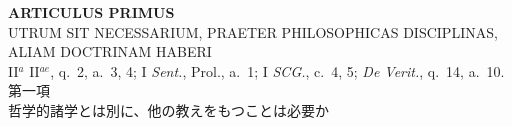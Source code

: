 \documentclass[
paper=a4paper,
fontsize=10pt,
jafontsize=9pt,
titlepage
]{jlreq}
\begin{document}
\newpage

{}
\setcounter{section}{1}
\setcounter{subsection}{0}
\begin{center}
 {\Large {\bfseries ARTICULUS PRIMUS}}\\
 {\large UTRUM SIT NECESSARIUM, PRAETER PHILOSOPHICAS
 DISCIPLINAS,\\ALIAM DOCTRINAM HABERI}\\
 {\footnotesize II$^a$ II$^{ae}$, q.~2, a.~3, 4; I {\itshape Sent.},
 Prol., a.~1; I {\itshape SCG.}, c.~4, 5; {\itshape De Verit.}, q.~14, a.~10.}\\
 {\Large 第一項\\哲学的諸学とは別に、他の教えをもつことは必要か}
\end{center}
\end{document}
